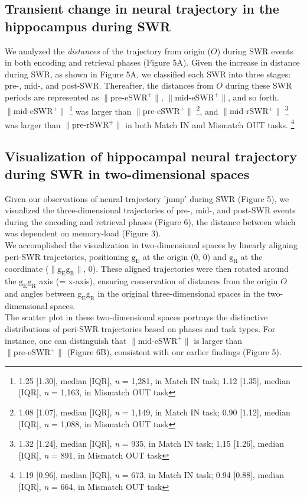 \documentclass[final,3p,times,twocolumn]{elsarticle}
\begin{document}
\subsection{Transient change in neural trajectory in the hippocampus during SWR}
We analyzed the \textit{distances} of the trajectory from origin ($O$) during SWR events in both encoding and retrieval phases (Figure 5A). Given the increase in distance during SWR, as shown in Figure 5A, we classified each SWR into three stages: pre-, mid-, and post-SWR. Thereafter, the distances from $O$ during these SWR periods are represented as $\mathrm{\lVert \text{pre-eSWR}^+ \rVert}$, $\mathrm{\lVert \text{mid-eSWR}^+ \rVert}$, and so forth.
\\
\indent
$\mathrm{\lVert \text{mid-eSWR}^+ \rVert}$
\footnote{1.25 [1.30], median [IQR], \textit{n} = 1,281, in Match IN task; 1.12 [1.35], median [IQR], \textit{n} = 1,163, in Mismatch OUT task}
was larger than $\mathrm{\lVert \text{pre-eSWR}^+ \rVert}$
\footnote{1.08 [1.07], median [IQR], \textit{n} = 1,149, in Match IN task; 0.90 [1.12], median [IQR], \textit{n} = 1,088, in Mismatch OUT task}, and $\mathrm{\lVert \text{mid-rSWR}^+ \rVert}$ 
\footnote{1.32 [1.24], median [IQR], \textit{n} = 935, in Match IN task; 1.15 [1.26], median [IQR], \textit{n} = 891, in Mismatch OUT task}
was larger than $\mathrm{\lVert \text{pre-rSWR}^+ \rVert}$ in both Match IN and Mismatch OUT tasks.
\footnote{1.19 [0.96], median [IQR], \textit{n} = 673, in Match IN task; 0.94 [0.88], median [IQR], \textit{n} = 664, in Mismatch OUT task}

\subsection{Visualization of hippocampal neural trajectory during SWR in two-dimensional spaces}
Given our observations of neural trajectory 'jump' during SWR (Figure 5), we visualized the three-dimensional trajectories of pre-, mid-, and post-SWR events during the encoding and retrieval phases (Figure 6), the distance between which was dependent on memory-load (Figure 3).
\\
\indent
We accomplished the visualization in two-dimensional spaces by linearly aligning peri-SWR trajectories, positioning $\mathrm{g_{E}}$ at the origin (0, 0) and $\mathrm{g_{R}}$ at the coordinate ($\mathrm{\lVert g_{E}g_{R} \rVert}$, 0). These aligned trajectories were then rotated around the $\mathrm{g_{E}g_{R}}$ axis (= x-axis), ensuring conservation of distances from the origin $O$ and angles between $\mathrm{g_{E}g_{R}}$ in the original three-dimensional spaces in the two-dimensional spaces.
\\
\indent
The scatter plot in these two-dimensional spaces portrays the distinctive distributions of peri-SWR trajectories based on phases and task types. For instance, one can distinguish that $\mathrm{\lVert \text{mid-eSWR}^+ \rVert}$ is larger than $\mathrm{\lVert \text{pre-eSWR}^+ \rVert}$ (Figure 6B), consistent with our earlier findings (Figure 5).
\end{document}
